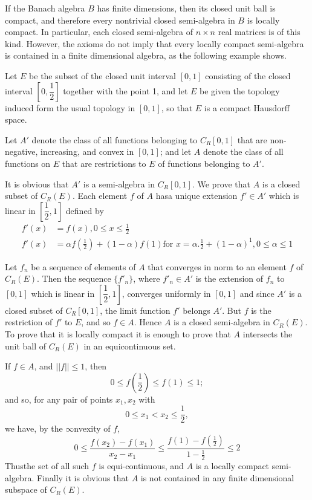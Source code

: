 If the Banach algebra $B$ has finite dimensions, then its closed unit
ball is compact, and therefore every nontrivial closed semi-algebra in
$B$ is locally compact. In particular, each closed semi-algebra of $n
\times n$ real matrices is of this kind. However, the axioms do not
imply that every locally compact semi-algebra is contained in a finite
dimensional algebra, as the following example shows. 

\begin{example*}
  Let $E$ be the subset of the closed unit interval $[0,1]$ consisting
  of the closed interval $[0, \dfrac{1}{2}]$ together with the point
  1, and let $E$ be given the topology induced form the usual
  topology in $[0, 1]$, so that $E$ is a compact Hausdorff space. 
\end{example*}

Let $A'$ denote the class of all functions belonging to $C_R[0, 1]$
that are non-negative, increasing, and convex in $[0, 1]$; and let $A$
denote the class of all functions on $E$ that are restrictions to $E$
of functions belonging to $A'$. 

It is obvious that $A'$ is a semi-algebra in $C_R[0, 1]$. We prove
that $A$ is a closed subset of $C_R(E)$. Each element $f$ of $A$
has\pageoriginale a unique extension $f' \in A'$ which is linear in $[
  \dfrac{1}{2}, 1]$ defined by   
\begin{align*}
  f'(x) & = f(x) , 0 \leq x \leq \frac{1}{2}\\
  f'(x) & = \alpha f\left(\frac{1}{2}\right) +(1-\alpha) f(1) \text{
    for } x =  \alpha. \frac{1}{2}+ (1- \alpha)^1, 0 \leq \alpha \leq 1  
\end{align*}

Let $f_n$ be a sequence of elements of $A$ that converges in norm to
an element $f$ of $C_R(E)$. Then the sequence $\{ f'_n \}$, where $f'_n
\in A'$ is the extension of $f_n$ to $[0, 1]$ which is linear in $[
  \dfrac{1}{2}, 1]$, converges uniformly in $[0, 1]$ and since $A'$ is
a closed subset of $C_R[0, 1]$, the limit function $f'$ belongs
$A'$. But $f$ is the restriction of $f'$ to $E$, and so $f \in
A$. Hence $A$ is a closed semi-algebra in $C_R(E)$. To prove that it
is locally compact it is enough to prove that $A$ intersects the unit
ball of $C_R(E)$ in an equicontinuous set. 

If $f \in A$, and $|| f || \leq 1$, then
$$
0 \leq f \left(\frac{1}{2}\right) \leq f(1) \leq 1;
$$
and so, for any pair of points $x_1, x_2$ with 
$$
0 \leq x_1 < x_2 \leq \frac{1}{2},
$$
we have, by the $\infty$nvexity of $f$,
$$
0 \leq \frac{f(x_2) - f(x_1)}{x_2 - x_1} \leq \frac{f(1)-
  f\left(\frac{1}{2}\right)}{1 - \frac{1}{2}} \leq 2 
$$
Thus\pageoriginale the set of all such $f$ is equi-continuous, and $A$
is a locally compact semi-algebra. Finally it is obvious that $A$ is
not contained in any finite dimensional subspace of $C_R(E)$.  

